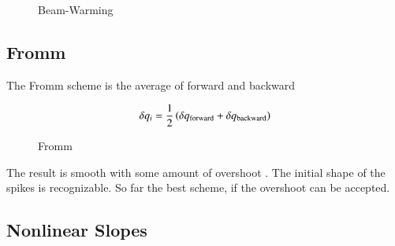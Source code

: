 \begin{figure}
  \begin{center}
  \end{center}
  \caption[]{Beam-Warming}
  \label{fig:beam-warming}
\end{figure}

\subsection{Fromm}

The Fromm scheme is the average of forward and backward

\begin{equation}
\delta q_i = \frac{1}{2}\left(\delta q_{\rm forward}+\delta q_{\rm backward}\right)
\end{equation}

\begin{figure}
  \begin{center}
  \end{center}
  \caption[]{Fromm}
  \label{fig:fromm}
\end{figure}

The result is smooth with some amount of overshoot . The initial shape
of the spikes is recognizable. So far the best scheme, if the
overshoot can be accepted.

\subsection{Nonlinear Slopes}

